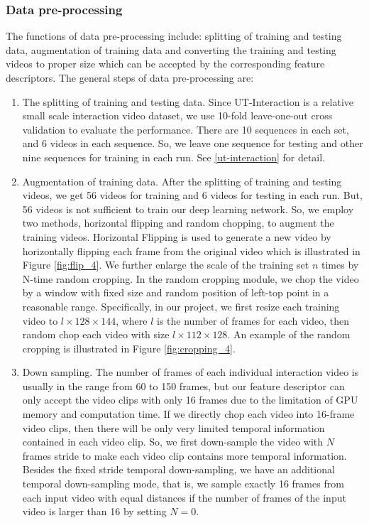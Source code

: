 \subsubsection*{Data pre-processing}
\label{pre_processing}
The functions of data pre-processing include: splitting of training and testing data, augmentation of training data and converting the training and testing videos to proper size which can be accepted by the corresponding feature descriptors.  The general steps of data pre-processing are:
\begin{enumerate}
	\item The splitting of training and testing data. Since UT-Interaction is a  relative small scale interaction video dataset, we use 10-fold leave-one-out cross validation to evaluate the performance. There are 10 sequences in each set, and 6 videos in each sequence. So, we leave one sequence for testing and other nine sequences for training in each run. See \ref{ut-interaction} for detail.
	\label{augmentation}
	\item Augmentation of training data.  After the splitting of training and testing videos, we get 56 videos for training and 6 videos for testing in each run. But, 56 videos is not sufficient to train our deep learning network. So, we employ two methods, horizontal flipping and random chopping, to augment the training videos. Horizontal Flipping is used to generate a new video by horizontally flipping each frame from the original video which is illustrated in Figure \ref{fig:flip_4}. We further enlarge the scale of the training set \(n\) times by N-time random cropping. In the random cropping module, we chop the video by a window with fixed size and random position of left-top point in a reasonable range. Specifically, in our project, we first resize each training video to \(l \times 128 \times 144\), where \(l\) is the number of frames for each video, then random chop each video with size \(l \times 112 \times 128\). An example of the random cropping is illustrated in Figure \ref{fig:cropping_4}.
	\label{down-sampling}
	\item Down sampling. The number of frames of each individual interaction video is usually in the range from 60 to 150 frames, but our feature descriptor can only accept the video clips with only 16 frames due to the limitation of GPU memory and computation time. If we directly chop each video into 16-frame video clips, then there will be only very limited temporal information contained in each video clip. So, we first down-sample the video with \(N\) frames stride to make each video clip contains more temporal information. Besides the fixed stride temporal down-sampling, we have an additional temporal down-sampling mode, that is, we  sample exactly 16 frames from each input video with equal distances if the number of frames of the input video is larger than 16 by setting \(N=0\).  
	

\end{enumerate}

